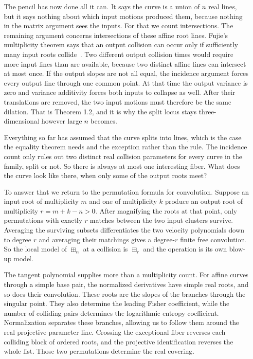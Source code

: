\documentclass[12pt,reqno]{amsart}
\theoremstyle{definition}
\theoremstyle{remark}
\begin{document}
The pencil has now done all it can. It says the curve is a union of $n$ real lines, but it says nothing about which input motions produced them, because nothing in the matrix argument sees the inputs. For that we count intersections. The remaining argument concerns intersections of these affine root lines. Fujie's multiplicity theorem says that an output collision can occur only
if sufficiently many input roots collide~\cite[Propositions~3.6
and~3.8]{Fujie26}. Two different output collision times would require
more input lines than are available, because two distinct affine lines can
intersect at most once.  If the output slopes are not all equal, the incidence
argument forces every output line through one common point.  At that time the output variance is zero and variance additivity forces both inputs to collapse as well. After their translations are removed, the two input motions must therefore be the same dilation. That is Theorem 1.2, and it is why the split locus stays three-dimensional however large $n$ becomes.

Everything so far has assumed that the curve splits into lines, which is the case the equality theorem needs and the exception rather than the rule. The incidence count only rules out two distinct real collision parameters for every curve in the family, split or not. So there is always at most one interesting fiber. What does the curve look like there, when only some of the output roots meet?

To answer that we return to the permutation formula for convolution. Suppose an input root of multiplicity $m$ and one of multiplicity $k$ produce an output root of multiplicity $r=m+k-n>0$. After magnifying the roots at that point, only permutations with exactly $r$ matches between the two input clusters survive. Averaging the surviving subsets differentiates the two velocity polynomials down to degree $r$ and averaging their matchings gives a degree-$r$ finite free convolution. So the local model of $\boxplus_n$ at a collision is $\boxplus_r$ and the operation is its own blow-up model.

The tangent polynomial supplies more than a multiplicity count.
For affine curves through a simple base pair, the normalized
derivatives have simple real roots, and so does their convolution.
These roots are the slopes of the branches through the singular
point. They also determine the leading Fisher coefficient, while
the number of colliding pairs determines the logarithmic entropy
coefficient. Normalization separates these branches, allowing us to follow
them around the real projective parameter line. Crossing the
exceptional fiber reverses each colliding block of ordered roots,
and the projective identification reverses the whole list.
Those two permutations determine the real covering.
\end{document}

